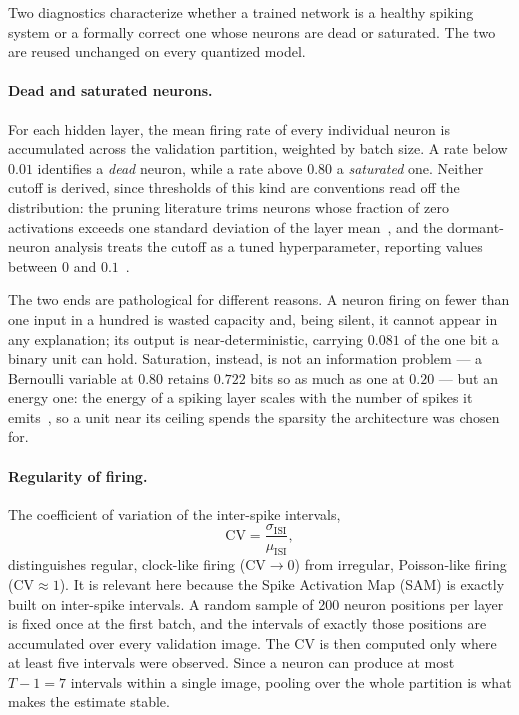 Two diagnostics characterize whether a trained network is a healthy spiking
system or a formally correct one whose neurons are dead or saturated. The two are
reused unchanged on every quantized model.
 
\paragraph{Dead and saturated neurons.} For each hidden layer, the mean firing rate of every individual neuron is
accumulated across the validation partition, weighted by batch size. A rate
below $0.01$ identifies a \emph{dead} neuron, while a rate above $0.80$ a \emph{saturated}
one. Neither cutoff is derived, since thresholds of this kind are conventions read
off the distribution: the pruning literature trims neurons whose fraction of
zero activations exceeds one standard deviation of the layer
mean~\cite{hu2016trimming}, and the dormant-neuron analysis treats the cutoff
as a tuned hyperparameter, reporting values between $0$ and
$0.1$~\cite{sokar2023dormant}.

The two ends are pathological for different reasons. A neuron firing on fewer
than one input in a hundred is wasted capacity and, being silent, it cannot
appear in any explanation; its output is near-deterministic, carrying $0.081$
of the one bit a binary unit can hold. Saturation, instead, is not an information
problem --- a Bernoulli variable at $0.80$ retains $0.722$ bits so as much as one
at $0.20$ --- but an energy one: the energy of a spiking layer scales with the
number of spikes it emits~\cite{suetake2023penalty}, so a unit near its ceiling
spends the sparsity the architecture was chosen for.

\paragraph{Regularity of firing.} The coefficient of variation of the
inter-spike intervals,
\begin{equation}
\mathrm{CV} = \frac{\sigma_{\mathrm{ISI}}}{\mu_{\mathrm{ISI}}},
\end{equation}
distinguishes regular, clock-like firing ($\mathrm{CV} \to 0$) from irregular,
Poisson-like firing ($\mathrm{CV} \approx 1$). It is relevant here because the
Spike Activation Map (SAM) is exactly built on inter-spike intervals. A random sample of 200
neuron positions per layer is fixed once at the first batch, and the intervals
of exactly those positions are accumulated over every validation image. The CV
is then computed only where at least five intervals were observed. Since a neuron can
produce at most $T - 1 = 7$ intervals within a single image, pooling over the
whole partition is what makes the estimate stable.

